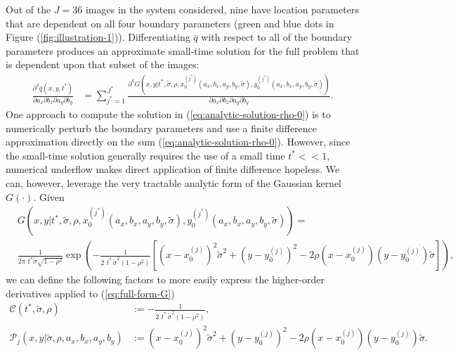 \documentclass[10pt]{article}
\begin{document}
Out of the $J=36$ images in the system considered, nine have location
parameters that are dependent on all four boundary parameters (green
and blue dots in Figure (\ref{fig:illustration-1})). Differentiating
$\bar{q}$ with respect to all of the boundary parameters produces an
approximate small-time solution for the full problem that is dependent
upon that subset of the images:
\begin{align}
  \frac{\partial^4 \bar{q}(x, y, t^{*})}{\partial a_x
  \partial b_x \partial a_y \partial b_y} &= \sum_{j^*=1}^{J^*} \frac{\partial^4
                                            G(x,y|t^{*}, \tilde{\sigma}, \rho, x_0^{(j^*)}(a_x, b_x, a_y, b_y, \tilde{\sigma}),
                                            y_0^{(j^*)}(a_x, b_x, a_y, b_y, \tilde{\sigma}))} {\partial a_x \partial b_x
                                            \partial a_y \partial b_y}. \label{eq:analytic-solution-rho-0}
\end{align}
One approach to compute the solution in
(\ref{eq:analytic-solution-rho-0}) is to numerically perturb the
boundary parameters and use a finite difference approximation directly
on the sum (\ref{eq:analytic-solution-rho-0}). However, since the
small-time solution generally requires the use of a small time
$t^* << 1$, numerical underflow makes direct application of finite
difference hopeless. We can, however, leverage the very tractable
analytic form of the Gaussian kernel $G(\cdot)$. Given
\begin{align}
  & G(x,y | t^{*}, \tilde{\sigma}, \rho, x_0^{(j^*)}(a_x, b_x, a_y, b_y, \tilde{\sigma}),
    y_0^{(j^*)}(a_x, b_x, a_y, b_y, \tilde{\sigma})) = &  \nonumber \\
  & \frac{1}{2\pi\,\, t^{*}\tilde{\sigma}\sqrt{1-\rho^2}} \exp\left( -\frac{1}{2\,\,t^*\, \tilde{\sigma}^2 (1-\rho^2)} \left[ \left(x-x_0^{(j)}\right)^2 \tilde{\sigma}^2 + \left(y-y_0^{(j)}\right)^2 - 2\rho(x-x_0^{(j)})(y-y_0^{(j)})\tilde{\sigma} \right]\right), & \label{eq:full-form-G}
\end{align}
we can define the following factors to more easily express the
higher-order derivatives applied to (\ref{eq:full-form-G})
\begin{align}
  \mathcal{C}(t^*, \tilde{\sigma}, \rho) &:= -\frac{1}{2\,\,t^*\, \tilde{\sigma}^2 (1-\rho^2)}, \\
  \mathcal{P}_j(x,y | \tilde{\sigma}, \rho, a_x,b_x,a_y,b_y) &:= \left(x-x_0^{(j)}\right)^2 \tilde{\sigma}^2 + \left(y-y_0^{(j)}\right)^2 - 2\rho(x-x_0^{(j)})(y-y_0^{(j)})\tilde{\sigma}.
\end{align}
\end{document}
